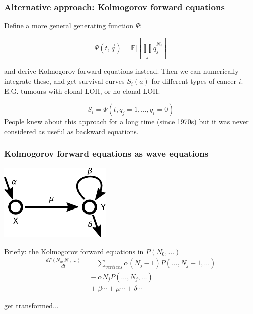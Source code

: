 \documentclass{beamer}
\begin{document}
\begin{frame}
    \frametitle{Alternative approach: Kolmogorov forward equations}
    Define a more general generating function $\Psi$:

    \begin{equation}
        \Psi(t, \vec{q}) = \mathbb{E}[\left[\prod_j q_j^{N_j}\right]
    \end{equation}

    and derive Kolmogorov forward equations instead. Then we can numerically
    integrate these, and get survival curves $S_i(a)$ for different types of
    cancer $i$. E.G. tumours with clonal LOH, or no clonal LOH.

    \begin{equation}
        S_i = \Psi(t, q_j =1, \dots, q_i = 0)
    \end{equation}
    People knew about this approach for a long time (since 1970s) but it was never
    considered as useful as backward equations.

\end{frame}

\begin{frame}
    \frametitle{Kolmogorov forward equations as wave equations}

\begin{center}
        \includegraphics[width=0.4\textwidth]{figures/diagram1}
\end{center}

    Briefly: the Kolmogorov forward equations in $P(N_0, \dots)$
\begin{align}
    \frac{d P(N_0, N_1, \dots)}{dt} &= \sum_{vertices} \alpha (N_j - 1)
    P(\dots, N_j - 1, \dots) \nonumber \\
    &\; - \alpha N_j P(\dots, N_j, \dots) \nonumber \\
    &\; + \beta \cdots + \mu \cdots + \delta \cdots \nonumber
\end{align}

get transformed...

\end{frame}
\end{document}

